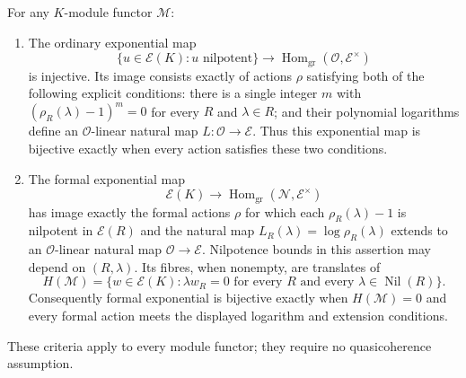 \begin{theorem}\label{C-functor-criterion}
For any $K$-module functor $\mathcal M$:
\begin{enumerate}
\item The ordinary exponential map
\[
 \{u\in\mathscr E(K):u\text{ nilpotent}\}
 \longrightarrow\operatorname{Hom}_{\mathrm{gr}}(\mathcal O,\mathscr E^\times)
\]
is injective. Its image consists exactly of actions $\rho$ satisfying both
of the following explicit conditions: there is a single integer $m$ with
$(\rho_R(\lambda)-1)^m=0$ for every $R$ and $\lambda\in R$; and their
polynomial logarithms define an $\mathcal O$-linear natural map
$L:\mathcal O\to\mathscr E$. Thus this exponential map is bijective
exactly when every action satisfies these two conditions.
\item The formal exponential map
\[
 \mathscr E(K)\longrightarrow
 \operatorname{Hom}_{\mathrm{gr}}(\mathcal N,\mathscr E^\times)
\]
has image exactly the formal actions $\rho$ for which each
$\rho_R(\lambda)-1$ is nilpotent in $\mathscr E(R)$ and the natural map
$L_R(\lambda)=\log\rho_R(\lambda)$ extends to an $\mathcal O$-linear
natural map $\mathcal O\to\mathscr E$. Nilpotence bounds in this assertion
may depend on $(R,\lambda)$. Its fibres, when nonempty, are translates of
\[
 H(\mathcal M)=\{w\in\mathscr E(K):
 \lambda w_R=0\text{ for every }R\text{ and every }
 \lambda\in\operatorname{Nil}(R)\}.
\]
Consequently formal exponential is bijective exactly when
$H(\mathcal M)=0$ and every formal action meets the displayed logarithm
and extension conditions.
\end{enumerate}
These criteria apply to every module functor; they require no
quasicoherence assumption.
\end{theorem}
